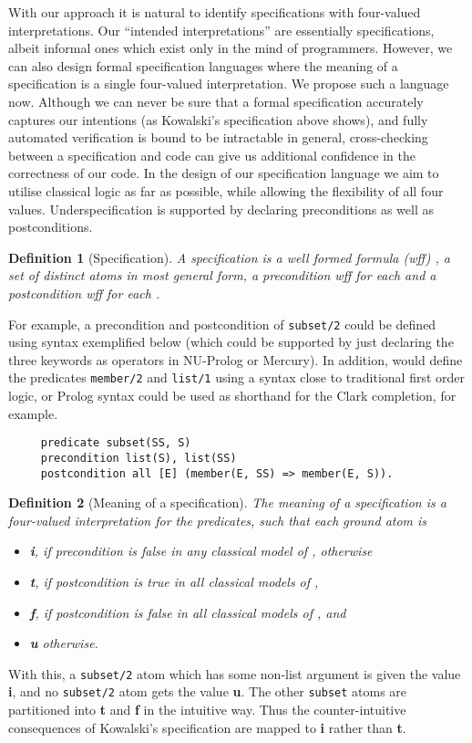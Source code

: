 \documentclass{tlp}
\newtheorem{definition}{Definition}
\begin{document}
With our approach it is natural to identify specifications with
four-valued interpretations.  Our ``intended interpretations'' are
essentially specifications, albeit informal ones which exist only in the
mind of programmers.  However, we can also design formal specification
languages where the meaning of a specification is a single four-valued
interpretation.  We propose such a language now.  Although we can never be
sure that a formal specification accurately captures our intentions
(as Kowalski's specification above shows), and fully automated
verification is bound to be intractable in general,
cross-checking between a specification and code can give us
additional confidence in
the correctness of our code.  In the design of our specification language
we aim to utilise classical logic as far as possible, while allowing
the flexibility of all four values.  Underspecification is supported by
declaring preconditions as well as postconditions.

\begin{definition}[Specification]
A specification is a well formed formula (wff) , a set of distinct
atoms  in most general form, a precondition wff  for each
 and a postcondition wff  for each .
\end{definition}

For example, a precondition and postcondition of \texttt{subset/2}
could be defined using syntax exemplified below 
(which could be supported by
just declaring the three keywords as operators in NU-Prolog or Mercury).
In addition,  would define the predicates \texttt{member/2} and
\texttt{list/1} using a syntax close to traditional first order logic,
or Prolog syntax could be used as shorthand for the Clark completion,
for example.


\begin{verbatim}
     predicate subset(SS, S)
     precondition list(S), list(SS)
     postcondition all [E] (member(E, SS) => member(E, S)).
\end{verbatim}

\begin{definition}[Meaning of a specification]
The meaning of a specification is a four-valued interpretation for the
 predicates, such that each ground atom  is
\begin{itemize}
\item \textbf{i}, if precondition  is
false in any classical model of , otherwise
\item \textbf{t}, if postcondition  is
true in all classical models of ,
\item \textbf{f}, if postcondition  is
false in all classical models of , and
\item \textbf{u} otherwise.
\end{itemize}	
\end{definition}
With this, a \texttt{subset/2} atom which has some non-list argument
is given the value \textbf{i}, and no \texttt{subset/2}
atom gets the value \textbf{u}. 
The other \verb!subset! atoms are partitioned into \textbf{t} and
\textbf{f} in the intuitive way.  
Thus the counter-intuitive consequences
of Kowalski's specification are mapped to
\textbf{i} rather than \textbf{t}.
\end{document}
